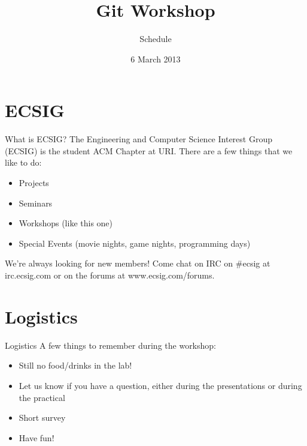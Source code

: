 \documentclass{beamer}
\title{Git Workshop}
\subtitle{Schedule}
\institute{Engineering and Computer Science Interest Group \\
           URI Student ACM Chapter}
\date{6 March 2013}
\begin{document}
\frame{\titlepage}

\section{ECSIG}
\begin{frame}{What is ECSIG?}
  The Engineering and Computer Science Interest Group (ECSIG) is the student
  ACM Chapter at URI. There are a few things that we like to do:
  \vfill
  \begin{itemize}
    \item Projects
    \item Seminars
    \item Workshops (like this one)
    \item Special Events (movie nights, game nights, programming days)
  \end{itemize}

  \vfill
  We're always looking for new members! Come chat on IRC on #ecsig at
  irc.ecsig.com or on the forums at www.ecsig.com/forums.
\end{frame}


\section{Logistics}
\begin{frame}{Logistics}
  A few things to remember during the workshop:

 \begin{itemize}
   \item Still no food/drinks in the lab!
   \item Let us know if you have a question, either during the presentations
         or during the practical
   \item Short survey
   \item Have fun!
 \end{itemize}

\end{frame}
\end{document}
